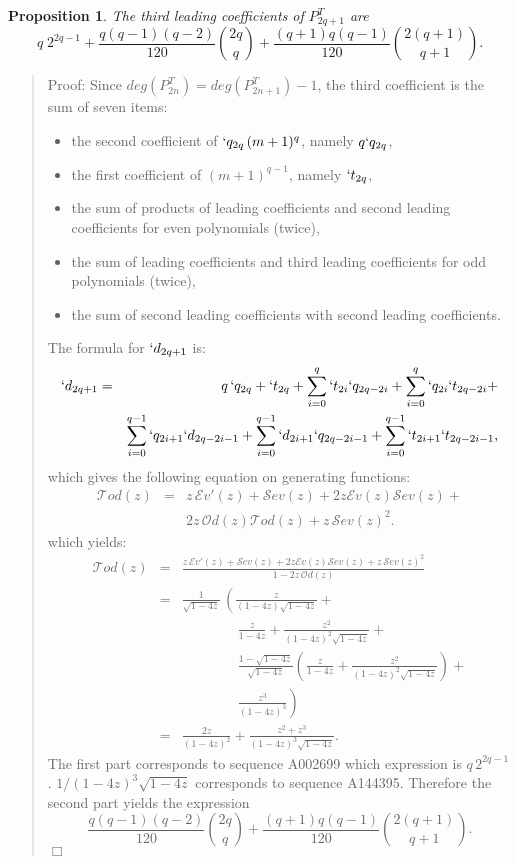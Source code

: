 \documentclass[preprint,authoryear]{elsarticle}
\newenvironment{proof}[1]{\begin{quotation}\noindent\textsf{Proof:} #1}{\(\Box\)\end{quotation}}
\newtheorem{prop}{Proposition}
\newcommand{\Od}{\mathcal{O}d}
\newcommand{\Tod}{\mathcal{T}od}
\newcommand{\Ev}{\mathcal{E}v}
\newcommand{\Sev}{\mathcal{S}ev}
\begin{document}
\begin{prop}
  The third leading coefficients of $P^T_{2q+1}$ are 
  \[q\;2^{2q-1} +\frac{q(q-1)(q-2)}{120}{2q\choose q}+ \frac{(q+1)q(q-1)}{120}{2(q+1)
    \choose q+1}.\]
\end{prop}
 \begin{proof}{}
    Since $deg(P^T_{2n}) = deg(P^T_{2n+1} )-1$, the third coefficient is the sum of seven
  items:
  \begin{itemize}
  \item the second coefficient of $`q_{2q}\,(m+1)^q$, namely $q`q_{2q}$,
  \item the first coefficient of $(m+1)^{q-1}$, namely $`t_{2q}$,
  \item the sum of products of leading coefficients and second leading coefficients for
    even polynomials (twice),
  \item the sum of leading coefficients and third leading coefficients for odd polynomials
    (twice),
  \item the sum of second leading coefficients with second leading coefficients.
  \end{itemize}
The formula for $`d_{2q+1}$ is:
\begin{eqnarray*}
  `d_{2q+1} &=& q\,`q_{2q} + `t_{2q} + \sum_{i=0}^q `t_{2i} `q_{2q-2i} + \sum_{i=0}^q
  `q_{2i}`t_{2q-2i} + \\
  &&\sum_{i=0}^{q-1} `q_{2i+1} `d_{2q-2i-1}  +  
  \sum_{i=0}^{q-1} `d_{2i+1} `q_{2q-2i-1} + \sum_{i=0}^{q-1} `t_{2i+1} `t_{2q-2i-1} ,
\end{eqnarray*}
which gives the following equation on generating functions:
\begin{eqnarray*}
  \Tod(z) &=& z\,\Ev'(z) + \Sev(z) + 2z\Ev(z)\Sev(z) +\\
  && 2z \,\Od(z)\Tod(z)+ z\,\Sev(z)^2.
\end{eqnarray*}
which yields:
\begin{eqnarray*}
  \Tod(z) &=& \frac{z\,\Ev'(z) + \Sev(z) + 2z\Ev(z)\Sev(z) + z\,\Sev(z)^2}{1-2z\,\Od(z)}\\
&=& \frac{1}{\sqrt{1-4z}}\,\left(\frac{z}{(1-4z)\sqrt{1-4z}} + \right.\\
&& \qquad \qquad \frac{z}{1-4z}+ \frac{z^2}{(1-4z)^2\sqrt{1-4z}}+\\
&&\qquad \qquad \frac{1-\sqrt{1-4z}}{\sqrt{1-4z}} \left(\frac{z}{1-4z} + \frac{z^2}{(1-4z)^2\sqrt{1-4z}}\right)+\\
&&\left.\qquad\qquad \frac{z^3}{(1-4z)^3}\right)\\
&=& \frac{2z}{(1-4z)^2} + \frac{z^2+z^3}{(1-4z)^3\sqrt{1-4z}}.
\end{eqnarray*}
The first part corresponds to sequence \textsf{A002699} which expression is
$q\,2^{2q-1}$. $1/(1-4z)^3\sqrt{1-4z}$ corresponds to sequence \textsf{A144395}. Therefore
the second part yields the expression \[\frac{q(q-1)(q-2)}{120}{2q\choose q}+ \frac{(q+1)q(q-1)}{120}{2(q+1)\choose q+1}.\]
  \end{proof}
\end{document}
